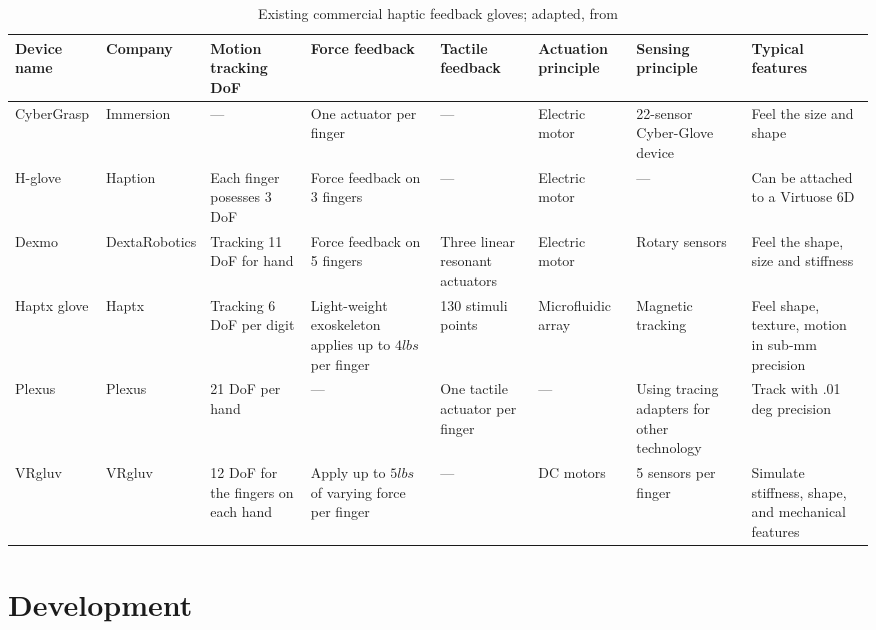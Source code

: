 \documentclass[hyperref, bachelorofscience]{cgvpub}
\begin{document}
\begin{table}
	\footnotesize
	\centering
	\begin{tabularx}{\textwidth}{llXXXXXX}		
		\toprule[2pt] \midrule
		Device name & Company & Motion tracking DoF & Force feedback & Tactile feedback & Actuation principle & Sensing principle & Typical features\\
		\midrule
		CyberGrasp & Immersion & --- & One actuator per finger & --- & Electric motor & 22-sensor Cyber-Glove device & Feel the size and shape \\
		\midrule
		H-glove & Haption & Each finger posesses 3 DoF & Force feedback on 3 fingers & --- & Electric motor & --- & Can be attached to a Virtuose 6D\\
		\midrule
		Dexmo & DextaRobotics & Tracking 11 DoF for hand & Force feedback on 5 fingers & Three linear resonant actuators & Electric motor & Rotary sensors & Feel the shape, size and stiffness \\
		\midrule
		Haptx glove & Haptx & Tracking 6 DoF per digit & Light-weight exoskeleton applies up to $ 4lbs $ per finger & 130 stimuli points & Microfluidic array & Magnetic tracking & Feel shape, texture, motion in sub-mm precision\\
		\midrule
		Plexus & Plexus & 21 DoF per hand & --- & One tactile actuator per finger & --- & Using tracing adapters for other technology & Track with .01 deg precision\\
		\midrule
		VRgluv & VRgluv & 12 DoF for the fingers on each hand & Apply up to $ 5lbs $ of varying force per finger & --- & DC motors & 5 sensors per finger & Simulate stiffness, shape, and mechanical features\\
		\midrule \bottomrule[2pt]
	\end{tabularx}
	\caption{Existing commercial haptic feedback gloves; adapted, from \cite{wang19}}
	\label{tab:commercial_gloves}
\end{table}

\chapter{Development} \label{ch:devel}
\end{document}
